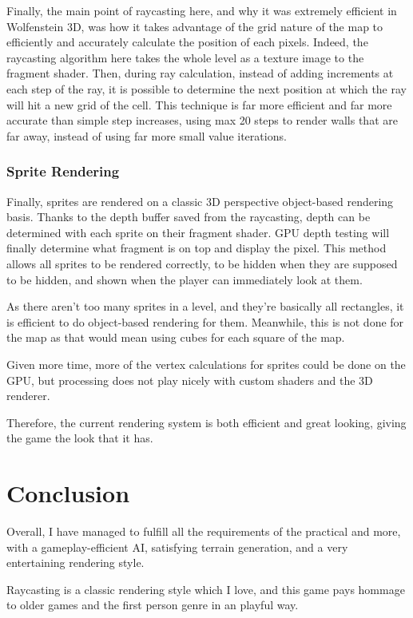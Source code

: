 \documentclass[11pt]{article}
\begin{document}
Finally, the main point of raycasting here, and why it was extremely efficient in Wolfenstein 3D, was how it takes
advantage of the grid nature of the map to efficiently and accurately calculate the position of each pixels.
Indeed, the raycasting algorithm here takes the whole level as a texture image to the fragment shader. Then, during ray
calculation, instead of adding increments at each step of the ray, it is possible to determine the next position at
which the ray will hit a new grid of the cell. This technique is far more efficient and far more accurate than simple
step increases, using max 20 steps to render walls that are far away, instead of using far more small value iterations.

\subsubsection{Sprite Rendering}
\label{sec:org8cc00fa}

Finally, sprites are rendered on a classic 3D perspective object-based rendering basis. Thanks to the depth buffer saved
from the raycasting, depth can be determined with each sprite on their fragment shader. GPU depth testing will finally
determine what fragment is on top and display the pixel. This method allows all sprites to be rendered correctly, to
be hidden when they are supposed to be hidden, and shown when the player can immediately look at them.

As there aren't too many sprites in a level, and they're basically all rectangles, it is efficient to do object-based
rendering for them. Meanwhile, this is not done for the map as that would mean using cubes for each square of the map.

Given more time, more of the vertex calculations for sprites could be done on the GPU, but processing does not play nicely
with custom shaders and the 3D renderer.

Therefore, the current rendering system is both efficient and great looking, giving the game the look that it has.

\section{Conclusion}
\label{sec:org2792ad3}
Overall, I have managed to fulfill all the requirements of the practical and more, with a gameplay-efficient AI, satisfying
terrain generation, and a very entertaining rendering style.

Raycasting is a classic rendering style which I love, and this game pays hommage to older games and
the first person genre in an playful way.
\end{document}
